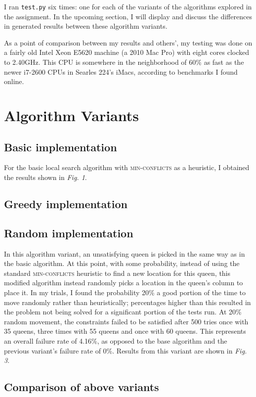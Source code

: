 \documentclass{article}
\begin{document}
\begin{doublespace}
I ran \texttt{test.py} six times: one for each of the variants of the algorithms explored in the assignment. In the upcoming section, I will display and discuss the differences in generated results between these algorithm variants.

As a point of comparison between my results and others', my testing was done on a fairly old Intel Xeon E5620 machine (a 2010 Mac Pro) with eight cores clocked to 2.40GHz. This CPU is somewhere in the neighborhood of 60\% as fast as the newer i7-2600 CPUs in Searles 224's iMacs, according to benchmarks I found online. 

\section{Algorithm Variants}
\subsection{Basic implementation}
For the basic local search algorithm with \textsc{min-conflicts} as a heuristic, I obtained the results shown in \textit{Fig. 1}. 
\subsection{Greedy implementation}
\subsection{Random implementation}
In this algorithm variant, an unsatisfying queen is picked in the same way as in the basic algorithm. At this point, with some probability, instead of using the standard \textsc{min-conflicts} heuristic to find a new location for this queen, this modified algorithm instead randomly picks a location in the queen's column to place it. In my trials, I found the probability 20\% a good portion of the time to move randomly rather than heuristically; percentages higher than this resulted in the problem not being solved for a significant portion of the tests run. At 20\% random movement, the constraints failed to be satisfied after 500 tries once with 35 queens, three times with 55 queens and once with 60 queens. This represents an overall failure rate of 4.16\%, as opposed to the base algorithm and the previous variant's failure rate of 0\%. Results from this variant are shown in \textit{Fig. 3}. 

\subsection{Comparison of above variants}


\end{doublespace}
\end{document}
